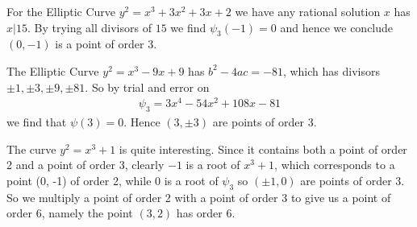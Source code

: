 \begin{example}
  For the Elliptic Curve
  $y^2 = x^3 + 3x^2 + 3x + 2$ we have
  any rational solution $x$ has
  $x|15$.
  By trying all divisors of $15$ we find $\psi_3(-1) = 0$ and
  hence we conclude $(0,-1)$ is a point of order 3.
\end{example}
\begin{example}
  The Elliptic Curve $y^2 = x^3 -9x + 9$
  has $b^2 - 4ac = -81$, which has divisors
  $\pm 1, \pm 3, \pm 9, \pm 81$.
  So by trial and error on
  \begin{align*}
    \psi_3 = 3x^4 - 54x^2 + 108x - 81
  \end{align*}
  we find that $\psi(3) = 0$.
  Hence $(3, \pm 3)$ are points of order 3.
\end{example}
\begin{example}
  The curve $y^2 = x^3 + 1$ is quite interesting.
  Since it contains both a point of order 2 and a point of order 3,
  clearly $-1$ is a root of $x^3 + 1$, which corresponds to a point (0, -1) of order 2,
  while $0$ is a root of $\psi_3$ so $(\pm 1, 0)$ are points of order 3.
  So we multiply a point of order 2 with a point of order 3 to give us a point of order 6,
  namely the point $(3, 2)$ has order 6.
\end{example}
